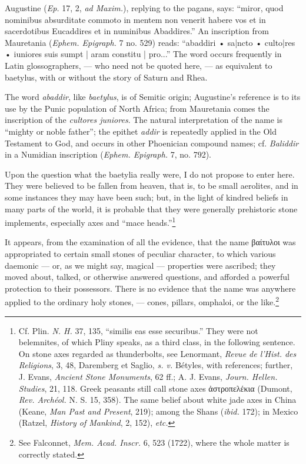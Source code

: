 \documentclass[a4paper, 12pt, oneside, polutonikogreek, english]{article}
\begin{document}
Augustine (\emph{Ep.} 17, 2, \emph{ad Maxim.}), replying to the pagans, says: ``miror, quod nominibus absurditate commoto in mentem non venerit habere vos et in sacerdotibus Eucaddires et in numinibus Abaddires.'' An inscription from Mauretania (\emph{Ephem. Epigraph.} 7 no. 529) reads: ``abaddiri • sa|ncto • culto|res • iuniores suis sumpt | aram constitu | pro...'' The word occurs frequently in Latin glossographers, --- who need not be quoted here, --- as equivalent to baetylus, with or without the story of Saturn and Rhea.

The word \emph{abaddir}, like \emph{baetylus}, is of Semitic origin; Augustine's reference is to its use by the Punic population of North Africa; from Mauretania comes the inscription of the \emph{cultores juniores}. The natural interpretation of the name is ``mighty or noble father''; the epithet \emph{addir} is repeatedly applied in the Old Testament to God, and occurs in other Phoenician compound names; cf. \emph{Baliddir} in a Numidian inscription (\emph{Ephem. Epigraph.} 7, no. 792).

Upon the question what the baetylia really were, I do not propose to enter here. They were believed to be fallen from heaven, that is, to be small aerolites, and in some instances they may have been such; but, in the light of kindred beliefs in many parts of the world, it is probable that they were generally prehistoric stone implements, especially axes and ``mace heads.''\footnote{Cf. Plin. \emph{N. H.} 37, 135, ``similis eas esse securibus.'' They were not belemnites, of which Pliny speaks, as a third class, in the following sentence. On stone axes regarded as thunderbolts, see Lenormant, \emph{Revue de l'Hist. des Religions}, 3, 48, Daremberg et Saglio, \emph{s. v.} Bétyles, with references; further, J. Evans, \emph{Ancient Stone Monuments}, 62 ff.; A. J. Evans, \emph{Journ. Hellen. Studies}, 21, 118. Greek peasants still call stone axes ἀστροπελέκια (Dumont, \emph{Rev. Archéol.} N. S. 15, 358). The same belief about white jade axes in China (Keane, \emph{Man Past and Present}, 219); among the Shans (\emph{ibid.} 172); in Mexico (Ratzel, \emph{History of Mankind}, 2, 152), \emph{etc.}}

It appears, from the examination of all the evidence, that the name βαίτυλοι was appropriated to certain small stones of peculiar character, to which various daemonic --- or, as we might say, magical --- properties were ascribed; they moved about, talked, or otherwise answered questions, and afforded a powerful protection to their possessors. There is no evidence that the name was anywhere applied to the ordinary holy stones, --- cones, pillars, omphaloi, or the like.\footnote{See Falconnet, \emph{Mem. Acad. Inscr.} 6, 523 (1722), where the whole matter is correctly stated.}
\end{document}
